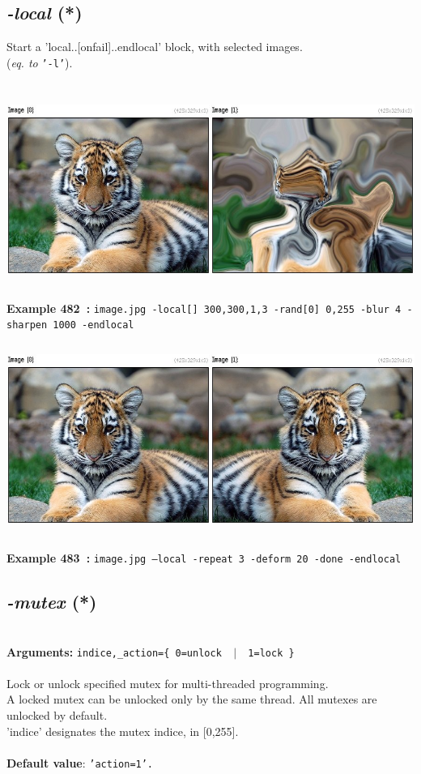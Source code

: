 \documentclass[a4paper,11pt,twoside]{book}
\begin{document}
\subsection{\emph{-local} (*)}\vspace*{-0.5em}
Start a 'local..[onfail]..endlocal' block, with selected images.
~\\(\emph{eq. to} {\small \texttt{'-l'}}).
\begin{center}\includegraphics[keepaspectratio=true,height=7cm,width=\textwidth]{img/gmic_def482.jpg}\\
{\footnotesize \textbf{Example 482~:} \texttt{image.jpg -local[] 300,300,1,3 -rand[0] 0,255 -blur 4 -sharpen 1000 -endlocal}}
\\\includegraphics[keepaspectratio=true,height=7cm,width=\textwidth]{img/gmic_def483.jpg}\\
{\footnotesize \textbf{Example 483~:} \texttt{image.jpg --local -repeat 3 -deform 20 -done -endlocal}}
\end{center}

\subsection{\emph{-mutex} (*)}\vspace*{-0.5em}
~\\\textbf{Arguments: } 
{\small \texttt{indice,\_action=\{ 0=unlock ~$|$~ 1=lock \}}}\\~\\
Lock or unlock specified mutex for multi-threaded programming.
~\\A locked mutex can be unlocked only by the same thread. All mutexes are unlocked by default.
~\\'indice' designates the mutex indice, in [0,255].
~\\~\\\textbf{Default value}: {\small \texttt{'action=1'.}}
\end{document}
